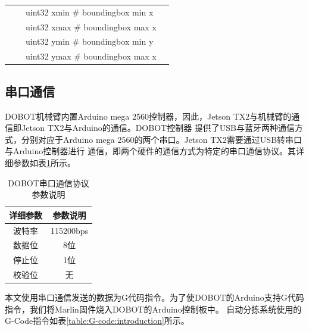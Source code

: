 {\begin{table}[htb]
\begin{tabular}[t]{l|l|l|l}
                           &               & uint32 xmin           \quad  \# boundingbox min x\\
                           &               & uint32 xmax           \quad \# boundingbox max x\\
                           &               & uint32 ymin           \quad  \# boundingbox min y\\
                           &               & uint32 ymax           \quad  \# boundingbox max x       \\    
            \hline
        \end{tabular} 
    \end{table}
}


\subsection{串口通信}

DOBOT机械臂内置Arduino mega 2560控制器，因此，Jetson TX2与机械臂的通信即Jetson TX2与Arduino的通信。DOBOT控制器
提供了USB与蓝牙两种通信方式，分别对应于Arduino mega 2560的两个串口。Jetson TX2需要通过USB转串口与Arduino控制器进行
通信，即两个硬件的通信方式为特定的串口通信协议。其详细参数如表\ref{table:serial:parameter}所示。

{
    \begin{table}[htb] 
        \caption{DOBOT串口通信协议参数说明}
        \label{table:serial:parameter}
        \centering
        \begin{tabular}[t]{c|c}
            \hline
            详细参数 & 参数说明  \\
            \hline
            波特率   & 115200bps \\
            \hline 
            数据位   & 8位 \\
            \hline
            停止位   & 1位 \\
            \hline
            校验位   & 无 \\
            \hline
        \end{tabular} 
    \end{table}
}

本文使用串口通信发送的数据为G代码指令。为了使DOBOT的Arduino支持G代码指令，我们将Marlin固件\cite{Marlin}烧入DOBOT的Arduino控制板中。
自动分拣系统使用的G-Code指令如表\ref{table:G-code:introduction}所示。

